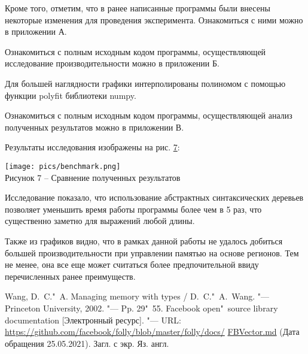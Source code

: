\documentclass[bachelor, och, coursework]{SCWorks}
\begin{document}
    Кроме того, отметим, что в ранее написанные программы были внесены некоторые изменения для 
    проведения эксперимента. Ознакомиться с ними можно в приложении А.%

    Ознакомиться с полным исходным кодом программы, осуществляющей 
    исследование производительности можно в приложении Б.%

    Для большей наглядности графики интерполированы полиномом с помощью функции polyfit библиотеки numpy.

    Ознакомиться с полным исходным кодом программы, осуществляющей 
    анализ полученных результатов можно в приложении В.%

    Результаты исследования изображены на рис. \hyperref[7]{7}:

    \begin{center}
        \texttt{[image: pics/benchmark.png]}\\
        {\small Рисунок 7 – Сравнение полученных результатов}\label{7}
    \end{center}

    Исследование показало, что использование абстрактных синтаксических деревьев позволяет уменьшить время 
    работы программы более чем в 5 раз, что существенно заметно для выражений любой длины.

    Также из графиков видно, что в рамках данной работы не удалось добиться большей производительности при 
    управлении памятью на основе регионов. Тем не менее, она все еще может считаться более предпочительной 
    ввиду перечисленных ранее преимуществ.

    \begin{thebibliography}{7}
         Wang, D.~C."~A. Managing memory with types / D.~C."~A.~Wang. "--- Princeton
        University, 2002. "--- Pp. 29"~55.
         Facebook open"~source library documentation [Электронный ресурс]. "---
        URL: \href{https://github.com/facebook/folly/blob/master/folly/docs/}{https://github.com/facebook/folly/blob/master/folly/docs/}
        \href{https://github.com/facebook/folly/blob/master/folly/docs/}{FBVector.md} (Дата обращения 25.05.2021). Загл. с экр. Яз. англ.
    \end{thebibliography}
    \signatureline
\end{document}
